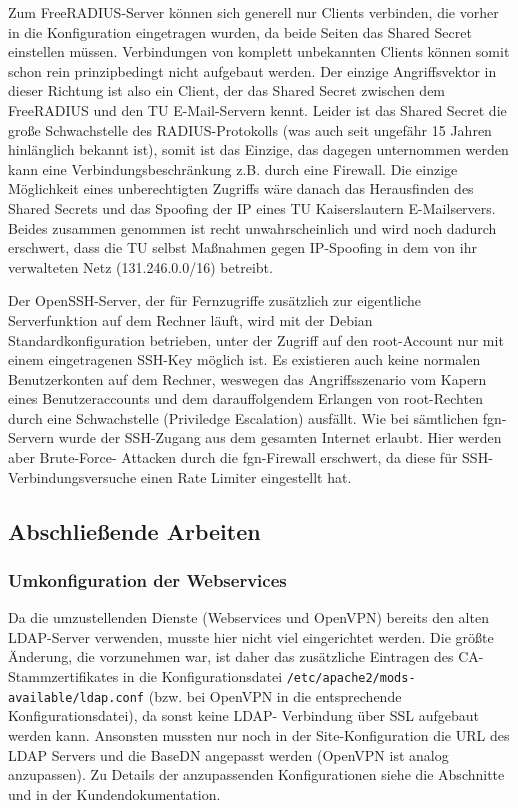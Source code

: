 \documentclass[11pt,a4paper,titlepage=firstiscover,headsepline,bibtotoc]{scrartcl} %
\newcommand{\hilight}[1]{\colorbox{yellow}{#1}} %
\begin{document}
Zum FreeRADIUS-Server können sich generell nur Clients verbinden, die vorher in die Konfiguration eingetragen wurden, da beide Seiten das Shared Secret einstellen müssen. Verbindungen von komplett unbekannten Clients können somit schon rein prinzipbedingt nicht aufgebaut werden. Der einzige Angriffsvektor in dieser Richtung ist also ein Client, der das Shared Secret zwischen dem FreeRADIUS und den TU E-Mail-Servern kennt. Leider ist das Shared Secret die große Schwachstelle des RADIUS-Protokolls (was auch seit ungefähr 15 Jahren hinlänglich bekannt ist), somit ist das Einzige, das dagegen unternommen werden kann eine Verbindungsbeschränkung z.B. durch eine Firewall. Die einzige Möglichkeit eines unberechtigten Zugriffs wäre danach das Herausfinden des Shared Secrets und das Spoofing der IP eines TU Kaiserslautern E-Mailservers. Beides zusammen genommen ist recht unwahrscheinlich und wird noch dadurch erschwert, dass die TU selbst Maßnahmen gegen IP-Spoofing in dem von ihr verwalteten Netz (131.246.0.0/16) betreibt.

Der OpenSSH-Server, der für Fernzugriffe zusätzlich zur eigentliche Serverfunktion auf dem Rechner läuft, wird mit der Debian Standardkonfiguration betrieben, unter der Zugriff auf den root-Account nur mit einem eingetragenen SSH-Key möglich ist. Es existieren auch keine normalen Benutzerkonten auf dem Rechner, weswegen das Angriffsszenario vom Kapern eines Benutzeraccounts und dem darauffolgendem Erlangen von root-Rechten durch eine Schwachstelle (Priviledge Escalation) ausfällt. Wie bei sämtlichen fgn-Servern wurde der SSH-Zugang aus dem gesamten Internet erlaubt. Hier werden aber Brute-Force- Attacken durch die fgn-Firewall erschwert, da diese für SSH-Verbindungsversuche einen Rate Limiter eingestellt hat.


\subsection{Abschließende Arbeiten}
\subsubsection{Umkonfiguration der Webservices}
Da die umzustellenden Dienste (Webservices und OpenVPN) bereits den alten LDAP-Server verwenden, musste hier nicht viel eingerichtet werden. Die größte Änderung, die vorzunehmen war, ist daher das zusätzliche Eintragen des CA-Stammzertifikates in die Konfigurationsdatei \texttt{/etc/apache2/mods-available/ldap.conf} (bzw. bei OpenVPN in die entsprechende Konfigurationsdatei), da sonst keine LDAP- Verbindung über SSL aufgebaut werden kann. Ansonsten mussten nur noch in der Site-Konfiguration die URL des LDAP Servers und die BaseDN angepasst werden (OpenVPN ist analog anzupassen). Zu Details der anzupassenden Konfigurationen siehe die Abschnitte  und  in der Kundendokumentation.
\end{document}
